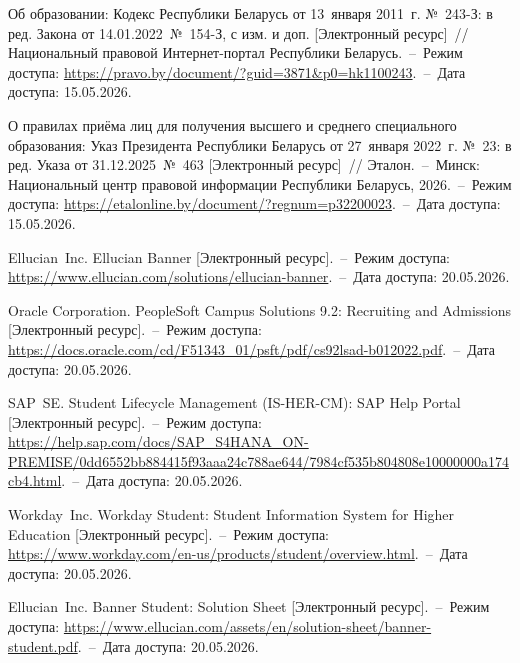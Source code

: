 
\begin{enumerate}[label=\arabic*, wide=0pt, labelsep=1ex, nosep]


 Об образовании: Кодекс Республики Беларусь от 13~января 2011~г. №~243-З: в ред. Закона от 14.01.2022~№~154-З, с изм. и доп. [Электронный ресурс]~// Национальный правовой Интернет-портал Республики Беларусь.~--~Режим доступа: \url{https://pravo.by/document/?guid=3871&p0=hk1100243}.~--~Дата доступа: 15.05.2026.

 О правилах приёма лиц для получения высшего и среднего специального образования: Указ Президента Республики Беларусь от 27~января 2022~г. №~23: в ред. Указа от 31.12.2025~№~463 [Электронный ресурс]~// Эталон.~--~Минск: Национальный центр правовой информации Республики Беларусь, 2026.~--~Режим доступа: \url{https://etalonline.by/document/?regnum=p32200023}.~--~Дата доступа: 15.05.2026.


\src[banner] Ellucian~Inc. Ellucian Banner [Электронный ресурс].~--~Режим доступа: \url{https://www.ellucian.com/solutions/ellucian-banner}.~--~Дата доступа: 20.05.2026.

\src[peoplesoft-cs] Oracle Corporation. PeopleSoft Campus Solutions 9.2: Recruiting and Admissions [Электронный ресурс].~--~Режим доступа: \url{https://docs.oracle.com/cd/F51343_01/psft/pdf/cs92lsad-b012022.pdf}.~--~Дата доступа: 20.05.2026.

 SAP~SE. Student Lifecycle Management (IS-HER-CM): SAP Help Portal [Электронный ресурс].~--~Режим доступа: \url{https://help.sap.com/docs/SAP_S4HANA_ON-PREMISE/0dd6552bb884415f93aaa24c788ae644/7984cf535b804808e10000000a174cb4.html}.~--~Дата доступа: 20.05.2026.

 Workday~Inc. Workday Student: Student Information System for Higher Education [Электронный ресурс].~--~Режим доступа: \url{https://www.workday.com/en-us/products/student/overview.html}.~--~Дата доступа: 20.05.2026.

 Ellucian~Inc. Banner Student: Solution Sheet [Электронный ресурс].~--~Режим доступа: \url{https://www.ellucian.com/assets/en/solution-sheet/banner-student.pdf}.~--~Дата доступа: 20.05.2026.


\end{enumerate}

